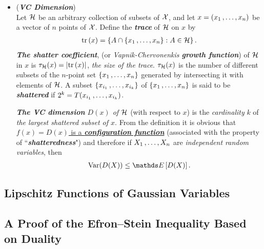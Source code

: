 \documentclass[11pt]{article}
\begin{document}
\begin{itemize}
\item \begin{example} (\emph{\textbf{VC Dimension}})\\
Let ${\mathcal H}$ be an arbitrary collection of subsets of ${\mathcal X}$, and let $x = (x_1 \,{,}\ldots{,}\, x_n)$ be a vector of $n$ points of ${\mathcal X}$. Define the \emph{\textbf{trace}} of ${\mathcal H}$ on $x$ by
\begin{align*}
\mathrm{tr}\left(x \right) = \left\{A \cap \left\{x_1 \,{,}\ldots{,}\, x_n\right\}: A \in {\mathcal H}\right\}.
\end{align*}
\emph{\textbf{The shatter coefficient}}, (or \emph{Vapnik-Chervonenkis \textbf{growth function}}) of ${\mathcal H}$ in $x$ is $\tau_{{\mathcal H}}(x) = \left\lvert \mathrm{tr}\left(x \right) \right\rvert$, \emph{the size of the trace}. $\tau_{{\mathcal H}}(x)$ is the number of different subsets of the $n$-point set $\left\{x_1 \,{,}\ldots{,}\, x_n\right\}$ generated by intersecting it with elements of ${\mathcal H}$. A subset
$\left\{x_{i_1} \,{,}\ldots{,}\, x_{i_k}\right\}$ of $\left\{x_1 \,{,}\ldots{,}\, x_n\right\}$ is said to be \emph{\textbf{shattered}} if $2^k = T(x_{i_1} \,{,}\ldots{,}\, x_{i_k})$. 

\emph{\textbf{The VC dimension} $D(x)$ of ${\mathcal H}$} (with respect to $x$) is the \emph{cardinality} $k$ of \emph{the largest shattered subset of $x$}. From the definition it is obvious that \underline{$f(x) = D(x)$ is a \emph{\textbf{configuration function}}} (associated with the property of ``\emph{\textbf{shatteredness}}") and therefore if $X_1 \,{,}\ldots{,}\, X_n$ are \emph{independent random variables}, then
\begin{align*}
\text{Var}(D(X)) \le \E{}{D(X)}.
\end{align*}
\end{example}
\end{itemize}

\subsection{Lipschitz Functions of Gaussian Variables}


\subsection{A Proof of the Efron–Stein Inequality Based on Duality}
\newpage


\end{document}
